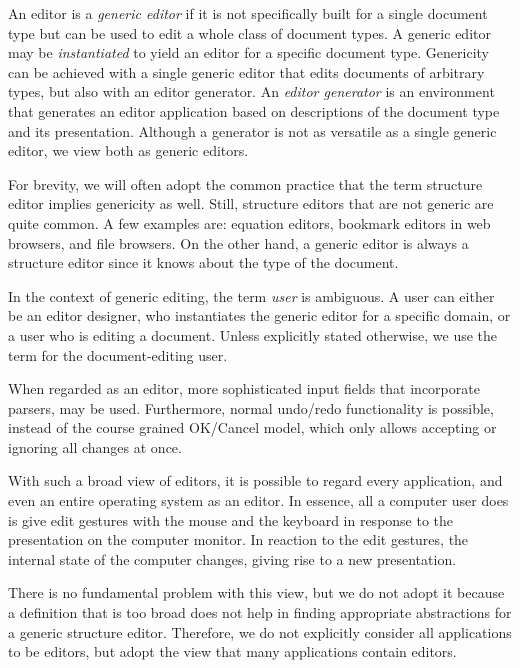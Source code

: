An editor is a {\em generic editor} if it is not specifically built for a single document type but can be used to edit a whole class of document types. A generic editor may be {\em instantiated} to yield an editor for a specific document type. Genericity can be achieved with a single generic editor that edits documents of arbitrary types, but also with an editor generator. An {\em editor generator} is an environment that generates an editor application based on descriptions of the document type and its presentation. Although a generator is not as versatile as a single generic editor, we view both as generic editors. 

For brevity, we will often adopt the common practice that the term structure editor implies genericity as well. Still, structure editors that are not generic are quite common. A few examples are: equation editors, bookmark editors in web browsers, and file browsers. On the other hand, a generic editor is always a structure editor since it knows about the type of the document.



In the context of generic editing, the term {\em user} is ambiguous. A user can either be an editor designer, who instantiates the generic editor for a specific domain, or a user who is editing a document. Unless explicitly stated otherwise, we use the term for the document-editing user.


\bc
When regarded as an editor, more sophisticated input fields that incorporate parsers, may be used. Furthermore, normal undo/redo functionality is possible, instead of the course grained OK/Cancel model, which only allows accepting or ignoring all changes at once.
\ec

\bc
With such a broad view of editors, it is possible to regard every application, and even an entire operating system as an editor. In essence, all a computer user does is give edit gestures with the mouse and the keyboard in response to the presentation on the computer monitor. In reaction to the edit gestures, the internal state of the computer changes, giving rise to a new presentation. 

There is no fundamental problem with this view, but we do not adopt it because a definition that is too broad does not help in finding appropriate abstractions for a generic structure editor. Therefore, we do not explicitly consider all applications to be editors, but adopt the view that many applications contain editors.
\ec


